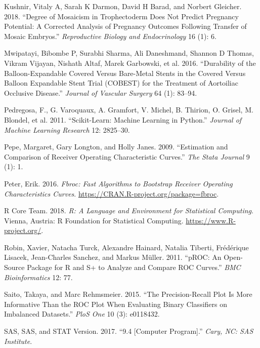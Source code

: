 \documentclass[smallextended]{svjour3}       %
\begin{document}
\leavevmode\hypertarget{ref-kushnir2018degree}{}%
Kushnir, Vitaly A, Sarah K Darmon, David H Barad, and Norbert Gleicher.
2018. ``Degree of Mosaicism in Trophectoderm Does Not Predict Pregnancy
Potential: A Corrected Analysis of Pregnancy Outcomes Following Transfer
of Mosaic Embryos.'' \emph{Reproductive Biology and Endocrinology} 16
(1): 6.

\leavevmode\hypertarget{ref-mwipatayi2016durability}{}%
Mwipatayi, Bibombe P, Surabhi Sharma, Ali Daneshmand, Shannon D Thomas,
Vikram Vijayan, Nishath Altaf, Marek Garbowski, et al. 2016.
``Durability of the Balloon-Expandable Covered Versus Bare-Metal Stents
in the Covered Versus Balloon Expandable Stent Trial (COBEST) for the
Treatment of Aortoiliac Occlusive Disease.'' \emph{Journal of Vascular
Surgery} 64 (1): 83--94.

\leavevmode\hypertarget{ref-scikitlearn}{}%
Pedregosa, F., G. Varoquaux, A. Gramfort, V. Michel, B. Thirion, O.
Grisel, M. Blondel, et al. 2011. ``Scikit-Learn: Machine Learning in
Python.'' \emph{Journal of Machine Learning Research} 12: 2825--30.

\leavevmode\hypertarget{ref-pepe2009estimation}{}%
Pepe, Margaret, Gary Longton, and Holly Janes. 2009. ``Estimation and
Comparison of Receiver Operating Characteristic Curves.'' \emph{The
Stata Journal} 9 (1): 1.

\leavevmode\hypertarget{ref-fbroc}{}%
Peter, Erik. 2016. \emph{Fbroc: Fast Algorithms to Bootstrap Receiver
Operating Characteristics Curves}.
\url{https://CRAN.R-project.org/package=fbroc}.

\leavevmode\hypertarget{ref-rcore}{}%
R Core Team. 2018. \emph{R: A Language and Environment for Statistical
Computing}. Vienna, Austria: R Foundation for Statistical Computing.
\url{https://www.R-project.org/}.

\leavevmode\hypertarget{ref-pROC}{}%
Robin, Xavier, Natacha Turck, Alexandre Hainard, Natalia Tiberti,
Frédérique Lisacek, Jean-Charles Sanchez, and Markus Müller. 2011.
``pROC: An Open-Source Package for R and S+ to Analyze and Compare ROC
Curves.'' \emph{BMC Bioinformatics} 12: 77.

\leavevmode\hypertarget{ref-saito2015precision}{}%
Saito, Takaya, and Marc Rehmsmeier. 2015. ``The Precision-Recall Plot Is
More Informative Than the ROC Plot When Evaluating Binary Classifiers on
Imbalanced Datasets.'' \emph{PloS One} 10 (3): e0118432.

\leavevmode\hypertarget{ref-sas}{}%
SAS, SAS, and STAT Version. 2017. ``9.4 {[}Computer Program{]}.''
\emph{Cary, NC: SAS Institute}.
\end{document}
